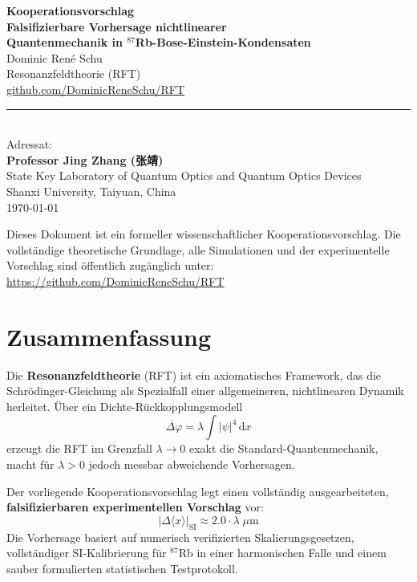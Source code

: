 \documentclass[a4paper,11pt]{article}
\begin{document}
\thispagestyle{empty}
\begin{center}
  {\LARGE\bfseries Kooperationsvorschlag}\\[0.5em]
  {\large\bfseries Falsifizierbare Vorhersage nichtlinearer\\
  Quantenmechanik in $^{87}$Rb-Bose-Einstein-Kondensaten}\\[2em]
  {\large Dominic Ren\'e Schu}\\[0.3em]
  {\normalsize Resonanzfeldtheorie (RFT)\\
  \href{https://github.com/DominicReneSchu/RFT}{github.com/DominicReneSchu/RFT}}\\[2em]
  \rule{0.6\textwidth}{0.4pt}\\[1em]
  {\normalsize Adressat:}\\[0.3em]
  {\large\bfseries Professor Jing Zhang (张靖)}\\
  {\normalsize State Key Laboratory of Quantum Optics and Quantum Optics Devices\\
  Shanxi University, Taiyuan, China}\\[2em]
  {\normalsize \today}
\end{center}

\vfill
\begin{center}
\small
Dieses Dokument ist ein formeller wissenschaftlicher Kooperationsvorschlag.
Die vollständige theoretische Grundlage, alle Simulationen und der
experimentelle Vorschlag sind öffentlich zugänglich unter:\\
\href{https://github.com/DominicReneSchu/RFT}{https://github.com/DominicReneSchu/RFT}
\end{center}
\newpage

\section{Zusammenfassung}

Die \textbf{Resonanzfeldtheorie} (RFT) ist ein axiomatisches Framework, das
die Schrödinger-Gleichung als Spezialfall einer allgemeineren, nichtlinearen
Dynamik herleitet. Über ein Dichte-Rückkopplungsmodell
\[
  \dot{\Delta\varphi} = \lambda \int |\psi|^4\,\mathrm{d}x
\]
erzeugt die RFT im Grenzfall $\lambda \to 0$ exakt die Standard-Quantenmechanik,
macht für $\lambda > 0$ jedoch messbar abweichende Vorhersagen.

Der vorliegende Kooperationsvorschlag legt einen vollständig ausgearbeiteten,
\textbf{falsifizierbaren experimentellen Vorschlag} vor:
\[
  \boxed{|\Delta\langle x\rangle|_{\mathrm{SI}} \approx 2.0 \cdot \lambda\;\mu\mathrm{m}}
\]
Die Vorhersage basiert auf numerisch verifizierten Skalierungsgesetzen,
vollständiger SI-Kalibrierung für $^{87}$Rb in einer harmonischen Falle
und einem sauber formulierten statistischen Testprotokoll.
\end{document}
